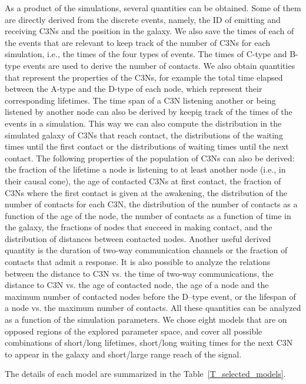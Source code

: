 \documentclass[crop]{CSLB}
\newcommand{\ceti}{C3N}
\newcommand{\cetis}{C3Ns}
\newcommand{\ttn}[1]{}
\begin{document}
As a product of the simulations, several quantities can be obtained.
%
Some of them are directly derived from the discrete events, namely, the ID of
emitting and receiving \cetis{} and the position in the galaxy.
%
We also save the times of each of the events that are relevant to keep track of
the number of \cetis{} for each simulation, i.e., the times of the four types
of events.
%
The times of C-type and B-type events are used to derive the number of
contacts.
%
We also obtain quantities that represent the properties of the \cetis{}, for
example the total time elapsed between the A-type and the D-type of each node,
which represent their corresponding lifetimes.
%
The time span of a \ceti{} listening another or being listened by another node
can also be derived by keepig track of the times of the events in a simulation.
%
This way we can also compute the distribution in the simulated galaxy of
\cetis{} that reach contact, the distributions of the waiting times until the
first contact or the distributions of waiting times until the next contact.
%
The following properties of the population of \cetis{} can also be derived:
%
the fraction of the lifetime a node is listening to at least another node
(i.e., in their causal cone),
%
the age of contacted \cetis{} at first contact,
%
the fraction of \cetis{} where the first contact is given at the awakening,
%
the distribution of the number of contacts for each \ceti{},
%
the distribution of the number of contacts as a function of the age of the
node,
%
the number of contacts as a function of time in the galaxy,
%
the fractions of nodes that succeed in making contact,
%
and the distribution of distances between contacted nodes.
%
Another useful derived quantity is the duration of two-way communication
channels or the fraction of contacts that admit a response.
% 
It is also possible to analyze the relations between the distance to \ceti{}
vs. the time of two-way communications, the distance to \ceti{} vs. the age of
contacted node, the age of a node and the maximum number of contacted nodes
before the D--type event, or the lifespan of a node vs. the maximum number of
contacts.
%
All these quantities can be analyzed as a function of the simulation
parameters.
%
We chose eight models that are on opposed regions of the explored parameter
space, and cover all possible combinations of short/long lifetimes, short/long
waiting times for the next \ceti{} to appear in the galaxy and short/large
range reach of the signal.
%
\ttn{2}
%
The details of each model are summarized in the Table~\ref{T_selected_models}.
\end{document}
